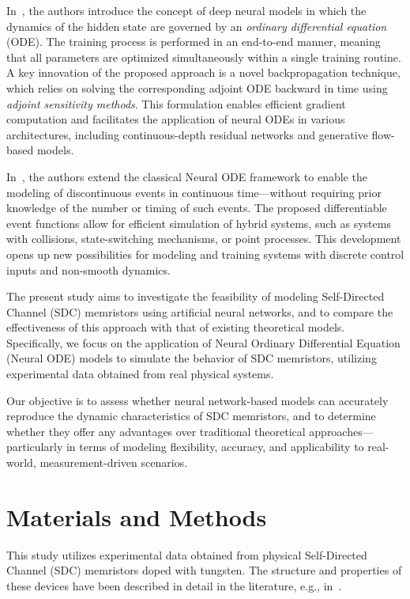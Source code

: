 \documentclass[lettersize,journal]{IEEEtran}
\begin{document}
In~\cite{Ricky2018}, the authors introduce the concept of deep neural models in which the dynamics of the hidden state are governed by an \textit{ordinary differential equation} (ODE). The training process is performed in an end-to-end manner, meaning that all parameters are optimized simultaneously within a single training routine. A key innovation of the proposed approach is a novel backpropagation technique, which relies on solving the corresponding adjoint ODE backward in time using \textit{adjoint sensitivity methods}. This formulation enables efficient gradient computation and facilitates the application of neural ODEs in various architectures, including continuous-depth residual networks and generative flow-based models.


In~\cite{Ricky2021}, the authors extend the classical Neural ODE framework to enable the modeling of discontinuous events in continuous time—without requiring prior knowledge of the number or timing of such events. The proposed differentiable event functions allow for efficient simulation of hybrid systems, such as systems with collisions, state-switching mechanisms, or point processes. This development opens up new possibilities for modeling and training systems with discrete control inputs and non-smooth dynamics.


The present study aims to investigate the feasibility of modeling Self-Directed Channel (SDC) memristors using artificial neural networks, and to compare the effectiveness of this approach with that of existing theoretical models. Specifically, we focus on the application of Neural Ordinary Differential Equation (Neural ODE) models to simulate the behavior of SDC memristors, utilizing experimental data obtained from real physical systems.

Our objective is to assess whether neural network-based models can accurately reproduce the dynamic characteristics of SDC memristors, and to determine whether they offer any advantages over traditional theoretical approaches—particularly in terms of modeling flexibility, accuracy, and applicability to real-world, measurement-driven scenarios.


\section{Materials and Methods}
\noindent This study utilizes experimental data obtained from physical Self-Directed Channel (SDC) memristors doped with tungsten. The structure and properties of these devices have been described in detail in the literature, e.g., in~\cite{Garda2024, Campbell2017}.
\end{document}
